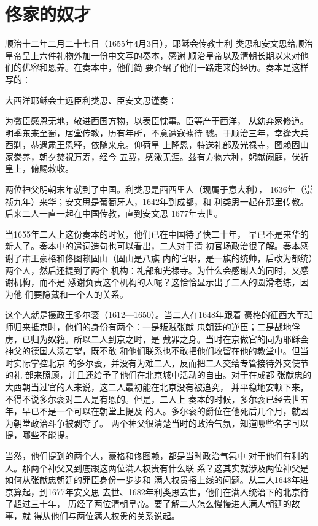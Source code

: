 \section{佟家的奴才}
\par
顺治十二年二月二十七日（1655年4月3日），耶稣会传教士利%
类思和安文思给顺治皇帝呈上六件礼物外加一份中文写的奏本，感谢%
顺治皇帝以及清朝长期以来对他们的优容和恩养。在奏本中，他们简%
要介绍了他们一路走来的经历。奏本是这样写的：%
\par
{\bookkai 大西洋耶稣会士远臣利类思、臣安文思谨奏：}%
\par
{\bookkai 为微臣感恩无地，敬进西国方物，以表臣忱事。臣等产于西洋，}%
{\bookkai 从幼弃家修道。明季东来至蜀，居堂传教，历有年所，不意遭寇掳待}%
{\bookkai 戮。于顺治三年，幸逢大兵西剿，恭遇肃王恩释，依随来京。仰荷皇}%
{\bookkai 上隆恩，特送礼部及光禄寺，图赖固山家豢养，朝夕焚祝万寿，经今}%
{\bookkai 五载，感激无涯。兹有方物六种，躬献阙庭，伏祈皇上，俯赐敕收。}%
\par
两位神父明朝末年就到了中国。利类思是西西里人（现属于意大利），%
1636年（崇祯九年）来华；安文思是葡萄牙人，1642年到成都，和%
利类思一起在那里传教。后来二人一直一起在中国传教，直到安文思%
1677年去世。%
\par
当1655年二人上这份奏本的时候，他们已在中国待了快二十年，%
早已不是来华的新人了。奏本中的遣词造句也可以看出，二人对于清%
初官场政治很了解。奏本感谢了肃王豪格和佟图赖固山（固山是八旗%
内的官职，是一旗的统帅，后改为都统）两个人，然后还提到了两个%
机构：礼部和光禄寺。为什么会感谢人的同时，又感谢机构，而不是%
感谢负责这个机构的人呢？这恰恰显示出了二人的圆滑老练，因为他%
们要隐藏和一个人的关系。%
\par
这个人就是摄政王多尔衮（1612—1650）。当二人在1648年跟着%
豪格的征西大军班师归来抵京时，他们的身份有两个：一是叛贼张献%
忠朝廷的逆臣；二是战地俘虏，已归为奴籍。所以二人到京之时，是%
戴罪之身。当时在京做官的同为耶稣会神父的德国人汤若望，既不敢%
和他们联系也不敢把他们收留在他的教堂中。但当时实际掌控北京%
的多尔衮，并没有为难二人，反而把二人交给专管接待外交使节的礼%
部来照顾，并且还给予了他们在北京城中活动的自由。对于在成都%
张献忠的大西朝当过官的人来说，这二人最初能在北京没有被追究，%
并平稳地安顿下来，不得不说多尔衮对二人是有恩的。但是，二人上%
奏本的时候，多尔衮已经去世五年，早已不是一个可以在朝堂上提及%
的人。多尔衮的爵位在他死后几个月，就因为朝堂政治斗争被剥夺了。%
两个神父很清楚当时的政治气氛，知道哪些名字可以提，哪些不能提。%
\par
当然，他们提到的两个人，豪格和佟图赖，都是当时政治气氛中%
对于他们有利的人。那两个神父又到底跟这两位满人权贵有什么联%
系？这其实就涉及两位神父是如何从张献忠朝廷的罪臣身份一步步和%
满人权贵搭上线的问题。从二人1648年进京算起，到1677年安文思%
去世、1682年利类思去世，他们在满人统治下的北京待了超过三十年，%
历经了两位清朝皇帝。要了解二人怎么慢慢进人满人朝廷的故事，就%
得从他们与两位满人权贵的关系说起。%
